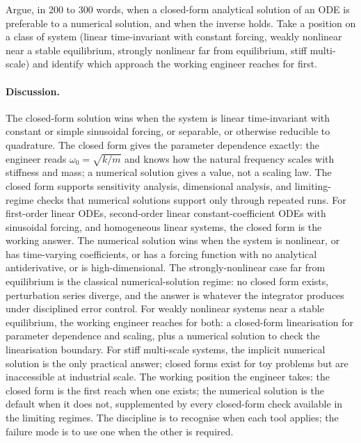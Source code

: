 \begin{exercise}
Argue, in 200 to 300 words, when a closed-form analytical
solution of an ODE is preferable to a numerical solution, and
when the inverse holds. Take a position on a class of system
(linear time-invariant with constant forcing, weakly nonlinear
near a stable equilibrium, strongly nonlinear far from
equilibrium, stiff multi-scale) and identify which approach the
working engineer reaches for first.

\paragraph{Discussion.} The closed-form solution wins when the
system is linear time-invariant with constant or simple
sinusoidal forcing, or separable, or otherwise reducible to
quadrature. The closed form gives the parameter dependence
exactly: the engineer reads $\omega_{0} = \sqrt{k/m}$ and knows
how the natural frequency scales with stiffness and mass; a
numerical solution gives a value, not a scaling law. The closed
form supports sensitivity analysis, dimensional analysis, and
limiting-regime checks that numerical solutions support only
through repeated runs. For first-order linear ODEs, second-order
linear constant-coefficient ODEs with sinusoidal forcing, and
homogeneous linear systems, the closed form is the working
answer. The numerical solution wins when the system is nonlinear,
or has time-varying coefficients, or has a forcing function with
no analytical antiderivative, or is high-dimensional. The
strongly-nonlinear case far from equilibrium is the classical
numerical-solution regime: no closed form exists, perturbation
series diverge, and the answer is whatever the integrator
produces under disciplined error control. For weakly nonlinear
systems near a stable equilibrium, the working engineer reaches
for both: a closed-form linearisation for parameter dependence
and scaling, plus a numerical solution to check the linearisation
boundary. For stiff multi-scale systems, the implicit numerical
solution is the only practical answer; closed forms exist for
toy problems but are inaccessible at industrial scale. The
working position the engineer takes: the closed form is the
first reach when one exists; the numerical solution is the
default when it does not, supplemented by every closed-form
check available in the limiting regimes. The discipline is to
recognise when each tool applies; the failure mode is to use
one when the other is required.
\end{exercise}

